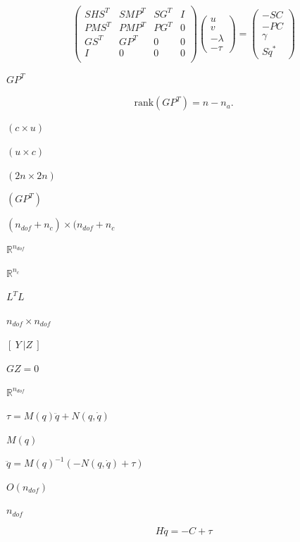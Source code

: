 \documentclass{article}
\begin{document}
\[
 \left(
   \begin{array}{cccc}
    S H S^T & S M P^T & S G^T & I \\
    P M S^T & P M P^T & P G^T & 0\\
    G S^T & G P^T & 0 & 0 \\
    I & 0 & 0 & 0 \\
   \end{array}
 \right)
 \left(
   \begin{array}{c}
    u \\
    v \\
    -\lambda\\
    -\tau
   \end{array}
 \right)
 =
 \left(
   \begin{array}{c}
     -SC\\
     -PC\\
    \gamma\\
    S \ddot{q}^*
   \end{array}
 \right)
 \]
\pagebreak

$GP^T$
\pagebreak

\[
     \text{rank}( GP^T ) = n - n_a.
  \]
\pagebreak

$(c \times u)$
\pagebreak

$(u \times c)$
\pagebreak

$(2n \times 2n)$
\pagebreak

$(GP^T)$
\pagebreak

$ (n_\textit{dof} +
n_c) \times (n_\textit{dof} + n_c$
\pagebreak

$ \mathbb{R}^{n_\textit{dof}}$
\pagebreak

$ \mathbb{R}^{n_c}$
\pagebreak

$L^TL $
\pagebreak

$n_\textit{dof} \times n_\textit{dof}$
\pagebreak

$\left[ \ Y \ | Z \ \right]$
\pagebreak

$GZ = 0$
\pagebreak

$\mathbb{R}^{n_\textit{dof}}$
\pagebreak

$ \tau = M(q) \ddot{q} + N(q, \dot{q}) $
\pagebreak

$ M(q) $
\pagebreak

$ \ddot{q} = M(q)^{-1} ( -N(q, \dot{q}) + \tau)$
\pagebreak

$O(n_{dof})$
\pagebreak

$n_{dof}$
\pagebreak

\[     H \ddot{q} = -C + \tau  \]
\pagebreak
\end{document}
